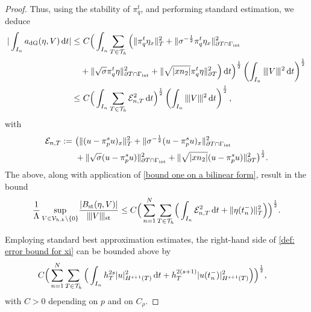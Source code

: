 \documentclass{amsart}
\newcommand{\norm}[2]{\|{#1}\|_{{#2}}}
\newcommand{\ud}{\,{\rm d}}
\newcommand{\su}{\sum_{T \in \Th}}
\newcommand{\Th}{\mathcal{T}_h}
\newcommand{\gint}{\Gamma_{\rm int}}
\newcommand{\ndg}[1]{|\kern-.03cm \|{#1}|\kern-.03cm \|}
\newcommand{\normal}{{n}}
\theoremstyle{definition}
\theoremstyle{remark}
\numberwithin{equation}{section}
\begin{document}
\begin{proof}
Thus, using the stability of $\pi_q^t$, and performing standard estimation, we deduce
\begin{equation*}\label{bound one on a bilinear form}
	\begin{aligned}
		| \int_{I_n} a_{\rm dG}(\eta,V ) \ud t|
		\leq & \
		C\Big(
		\int_{I_n}\su\Big(
		\norm{\pi_q^t\eta_x}{T}^2 + \norm{\sigma^{-\frac12}\pi_q^t\eta_x}{\partial T\cap \gint}^2 \\
		&+ \norm{\sqrt{\sigma}\pi_q^t\eta}{\partial T\cap \gint}^2		+ \norm{\sqrt{|x\normal_2|} \pi_q^t\eta}{\partial T}^2\Big)
		\ud t
		\Big)^{\frac12}
		\left(
		\int_{I_n}
		\ndg{V }^2
		\ud t
		\right)^{\frac12}\\
		\leq & \
		C\Big(
		\int_{I_n}\su\mathcal{E}_{n,T}^2
		\ud t
		\Big)^{\frac12}
		\left(
		\int_{I_n}
		\ndg{V }^2
		\ud t
		\right)^{\frac12},
	\end{aligned}
\end{equation*}
with
\[
\begin{aligned}
\mathcal{E}_{n,T}:=&\
\big(\norm{(u-\pi_p^su)_x}{T}^2 + \norm{\sigma^{-\frac12}(u-\pi_p^su)_x}{\partial T\cap \gint}^2\\
&\ + \norm{\sqrt{\sigma}(u-\pi_p^su)}{\partial T\cap \gint}^2
+ \norm{\sqrt{|x\normal_2|} (u-\pi_p^su)}{\partial T}^2\big)^{\frac12}.
\end{aligned}
\]
The above, along with application of \eqref{bound one on a bilinear form},  result in the bound
\begin{equation}\label{def: error bound for xi}
	\begin{aligned}
 \frac{1}{\Lambda}\sup_{V\in  {\mathcal{V}}_{h,k}\backslash \{0\}}\!\frac{|B_{\rm st}(\eta,V )|}{\ndg{V }_{\rm st}}
\leq  C\Big(
\sum_{n=1}^N
\su\!\Big( \int_{I_n}\mathcal{E}_{n,T}^2\ud t  +\norm{\eta(t_{n}^-)}{T}^2\Big)
\Big)^{\frac12}
.
\end{aligned}
\end{equation}


Employing standard best approximation estimates, the right-hand side of \eqref{def: error bound for xi} can be bounded above by
\begin{equation}\label{eq: xi bound Error time step}
	\begin{aligned}
 &    C\Big(
\sum_{n=1}^N \su\Big(
 \int_{I_n}
 h_T^{2s}| u|^2_{H^{s+1}(T)}
\ud t+ h_T^{2(s+1)}
| u(t_{n}^-)|^2_{H^{s+1}(T)}\Big)
\Big)^{\frac12}
,
	\end{aligned}
\end{equation}
with $C>0$ depending on $p$ and on $C_\rho$.


\end{proof}
\end{document}
